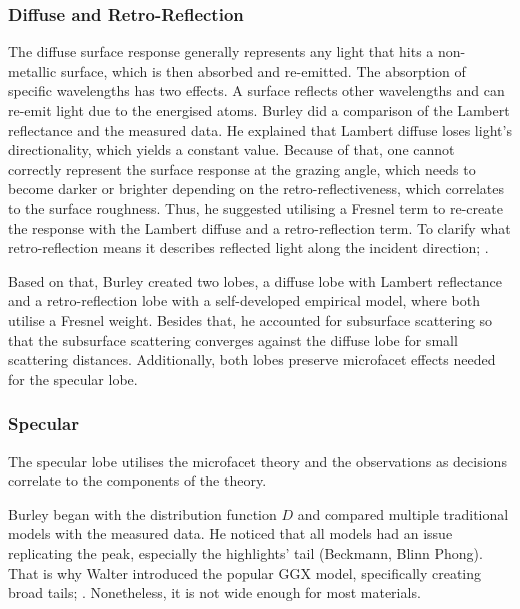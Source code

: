 \subsubsection*{Diffuse and Retro-Reflection}

The diffuse surface response generally represents any light that hits a non-metallic surface, which is then absorbed and re-emitted.
The absorption of specific wavelengths has two effects.
A surface reflects other wavelengths and can re-emit light due to the energised atoms.
Burley did a comparison \cite{burley_physically_2012} of the Lambert reflectance \cite{lambert_lamberts_1892} and the measured data.
He explained that Lambert diffuse loses light's directionality, which yields a constant value.
Because of that, one cannot correctly represent the surface response at the grazing angle, which needs to become darker or brighter depending on the retro-reflectiveness, which correlates to the surface roughness.
Thus, he suggested utilising a Fresnel term to re-create the response with the Lambert diffuse and a retro-reflection term.
To clarify what retro-reflection means it describes reflected light along the incident direction; \cite{berns_event_2021}.

Based on that, Burley \cite{burley_extending_2015} created two lobes, a diffuse lobe with Lambert reflectance and a retro-reflection lobe with a self-developed empirical model, where both utilise a Fresnel weight.
Besides that, he accounted for subsurface scattering so that the subsurface scattering converges against the diffuse lobe for small scattering distances.
Additionally, both lobes preserve microfacet effects needed for the specular lobe.

\subsubsection*{Specular}

The specular lobe utilises the microfacet theory and the observations as decisions correlate to the components of the theory.

Burley \cite{burley_physically_2012} began with the distribution function $D$ and compared multiple traditional models with the measured data.
He noticed that all models had an issue replicating the peak, especially the highlights' tail (Beckmann, Blinn Phong).
That is why Walter introduced the popular GGX model, specifically creating broad tails; \cite{walter_microfacet_2007}.
Nonetheless, it is not wide enough for most materials.

